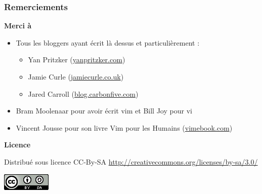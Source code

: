 \documentclass{beamer}
\begin{document}
\begin{frame}
\frametitle{Remerciements}

{\bf Merci à }

\begin{itemize}
    \item Tous les bloggers ayant écrit là dessus et particulièrement :
    \begin{itemize}
				\item \alert{Yan Pritzker} (\url{yanpritzker.com})
				\item \alert{Jamie Curle} (\url{jamiecurle.co.uk})
        \item \alert{Jared Carroll} (\url{blog.carbonfive.com})
    \end{itemize}
		\item \alert{Bram Moolenaar} pour avoir écrit vim et \alert{Bill Joy} pour vi
		\item \alert{Vincent Jousse} pour son livre \alert{Vim pour les Humains} (\url{vimebook.com})
\end{itemize}

{\bf Licence}

\begin{center}
    Distribué sous licence CC-By-SA
    \url{http://creativecommons.org/licenses/by-sa/3.0/}

		\includegraphics[height=.5cm]{cc-by-sa.png}
\end{center}
\end{frame}
\end{document}
